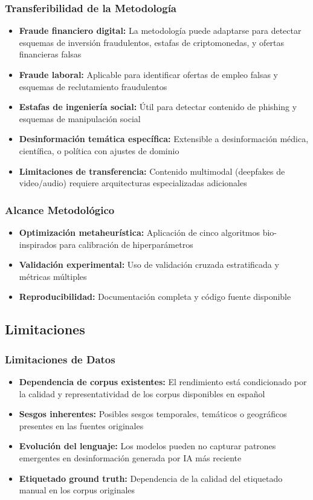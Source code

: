 \subsubsection{Transferibilidad de la Metodología}
\begin{itemize}
    \item \textbf{Fraude financiero digital:} La metodología puede adaptarse para detectar esquemas de inversión fraudulentos, estafas de criptomonedas, y ofertas financieras falsas
    \item \textbf{Fraude laboral:} Aplicable para identificar ofertas de empleo falsas y esquemas de reclutamiento fraudulentos
    \item \textbf{Estafas de ingeniería social:} Útil para detectar contenido de phishing y esquemas de manipulación social
    \item \textbf{Desinformación temática específica:} Extensible a desinformación médica, científica, o política con ajustes de dominio
    \item \textbf{Limitaciones de transferencia:} Contenido multimodal (deepfakes de video/audio) requiere arquitecturas especializadas adicionales
\end{itemize}

\subsubsection{Alcance Metodológico}
\begin{itemize}
    \item \textbf{Optimización metaheurística:} Aplicación de cinco algoritmos bio-inspirados para calibración de hiperparámetros
    \item \textbf{Validación experimental:} Uso de validación cruzada estratificada y métricas múltiples
    \item \textbf{Reproducibilidad:} Documentación completa y código fuente disponible
\end{itemize}

\subsection{Limitaciones}

\subsubsection{Limitaciones de Datos}
\begin{itemize}
    \item \textbf{Dependencia de corpus existentes:} El rendimiento está condicionado por la calidad y representatividad de los corpus disponibles en español
    \item \textbf{Sesgos inherentes:} Posibles sesgos temporales, temáticos o geográficos presentes en las fuentes originales
    \item \textbf{Evolución del lenguaje:} Los modelos pueden no capturar patrones emergentes en desinformación generada por IA más reciente
    \item \textbf{Etiquetado ground truth:} Dependencia de la calidad del etiquetado manual en los corpus originales
\end{itemize}

